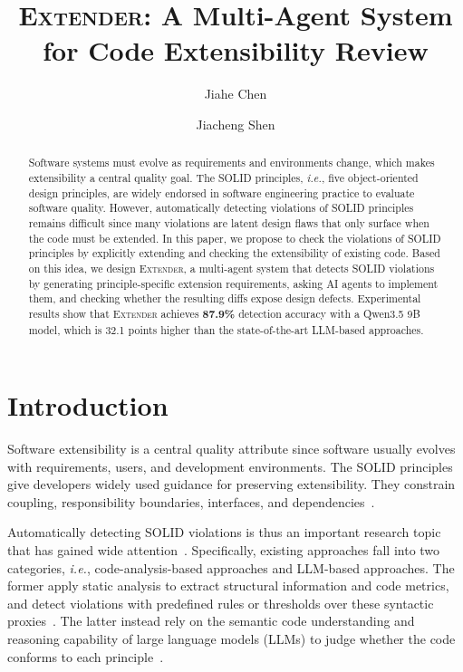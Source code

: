 \documentclass[sigconf,screen]{acmart}
\newcommand{\tool}{\textsc{Extender}\xspace}
\newcommand{\ie}{{\em i.e.},\xspace}
\begin{document}
\title{\tool: A Multi-Agent System for Code Extensibility Review}
\author{Jiahe Chen}

\author{Jiacheng Shen}

\begin{abstract}
Software systems must evolve as requirements and environments change, which makes extensibility a central quality goal.
The SOLID principles, \ie five object-oriented design principles, are widely endorsed in software engineering practice to evaluate software quality.
However, automatically detecting violations of SOLID principles remains difficult since many violations are latent design flaws that only surface when the code must be extended.
In this paper, we propose to check the violations of SOLID principles by explicitly extending and checking the extensibility of existing code.
Based on this idea, we design \tool, a multi-agent system that detects SOLID violations by generating principle-specific extension requirements, asking AI agents to implement them, and checking whether the resulting diffs expose design defects.
Experimental results show that \tool achieves \textbf{87.9\%} detection accuracy with a Qwen3.5 9B model, which is 32.1 points higher than the state-of-the-art LLM-based approaches.
\end{abstract}


\maketitle

\section{Introduction}\label{sec:intro}

Software extensibility is a central quality attribute since software usually evolves with requirements, users, and development environments.
The SOLID principles give developers widely used guidance for preserving extensibility.  
They constrain coupling, responsibility boundaries, interfaces, and dependencies~\cite{Martin2000,Martin2017,Ampatzoglou2019,Yanakiev2025}.

Automatically detecting SOLID violations is thus an important research topic that has gained wide attention~\cite{Sharma2018,Palomba2015,
Oktafiani2018,Chebanyuk2016,Martins2024,Pehlivan2025}.
Specifically, existing approaches fall into two categories, \ie code-analysis-based approaches and LLM-based approaches.
The former apply static analysis to extract structural information and code metrics, and detect violations with predefined rules or thresholds over these syntactic proxies~\cite{Sharma2018,Palomba2015,Oktafiani2018, Chebanyuk2016,Roy2024}.
The latter instead rely on the semantic code understanding and reasoning capability of large language models (LLMs) to judge whether the code conforms to each principle~\cite{Martins2024, Pehlivan2025}.
\end{document}
